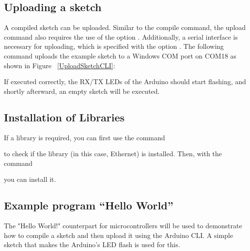 \subsection{Uploading a sketch}

A compiled sketch can be uploaded. Similar to the compile command, the upload command also requires the use of the option . Additionally, a serial interface is necessary for uploading, which is specified with the option . The following command uploads the example sketch to a Windows COM port on COM18 as shown in Figure ~\ref{UploadSketchCLI}:



If executed correctly, the RX/TX LEDs of the Arduino should start flashing, and shortly afterward, an empty sketch will be executed.

\subsection{Installation of Libraries}

If a library is required, you can first use the command


to check if the library (in this case, Ethernet) is installed. Then, with the command


you can install it.

\subsection{Example program ``Hello World''}

The "Hello World!" counterpart for microcontrollers will be used to demonstrate how to compile a sketch and then upload it using the Arduino CLI. A simple sketch that makes the Arduino's LED flash is used for this.

%

\medskip

{
}

